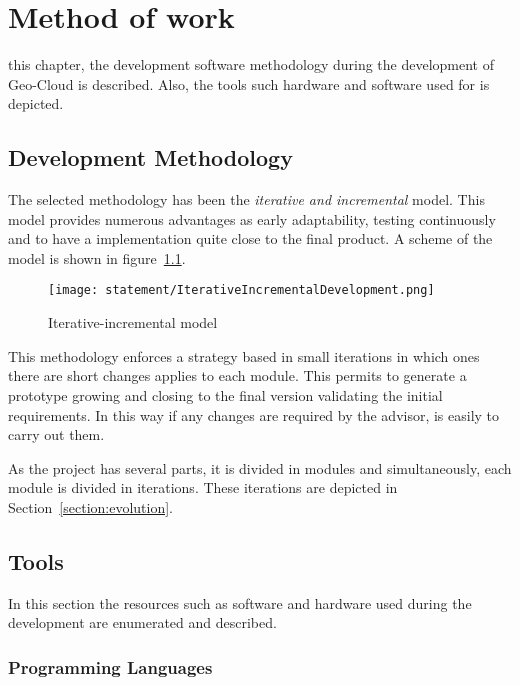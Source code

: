 \chapter{Method of work}
\label{chap:method}
 this chapter, the development software methodology during the
development of Geo-Cloud is described. Also, the tools such hardware and software used for is depicted.
 
\section{Development Methodology}
The selected methodology has been the \emph{iterative and incremental}
model. This model provides numerous advantages as early adaptability, testing
continuously and to have a implementation quite close to the final product. A
scheme of the model is shown in figure~\ref{fig:IncrementalModel}.


\begin{figure}[!h]
\begin{center}
\texttt{[image: statement/IterativeIncrementalDevelopment.png]}
\caption{Iterative-incremental model}
\label{fig:IncrementalModel}
\end{center}
\end{figure}

This methodology enforces a strategy based in small iterations in which ones
there are short changes applies to each module. This permits to generate a prototype
growing and closing to the final version validating the initial requirements. In
this way if any changes are required by the advisor, is easily to carry out
them.
 
As the project has several parts, it is divided in modules and simultaneously,
each module is divided in iterations. These iterations are depicted in Section~\ref{section:evolution}.

\section{Tools}

In this section the resources such as software and hardware used during the
development are enumerated and described.  



\subsection{Programming Languages}

